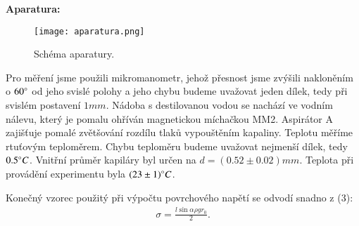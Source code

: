 \documentclass[a4paper]{article}
\begin{document}
\newline \textbf{Aparatura:} 
\newline
\begin{figure}
\centering
\texttt{[image: aparatura.png]}
\caption{Schéma aparatury. }
\end{figure}
\par Pro měření jsme použili mikromanometr, jehož přesnost jsme zvýšili nakloněním o $60 \degree $ od jeho svislé polohy a jeho chybu budeme uvažovat jeden dílek, tedy při svislém postavení $1 mm$. Nádoba s destilovanou vodou se nachází ve vodním nálevu, který je pomalu ohříván magnetickou míchačkou MM2. Aspirátor A zajišťuje pomalé zvětšování rozdílu tlaků vypouštěním kapaliny. Teplotu měříme rtuťovým teploměrem. Chybu teploměru budeme uvažovat nejmenší dílek, tedy $0.5 \degree C$. Vnitřní průměr kapiláry byl určen na $d = (0.52 \pm 0.02)mm$. Teplota při provádění experimentu byla $(23 \pm 1) \degree C$.
\newline
\par Konečný vzorec použitý při výpočtu povrchového napětí se odvodí snadno z (3):
\begin{align}
    \sigma = \frac{l\sin{\alpha} \rho g r_0}{2}.
\end{align}
\newpage
\end{document}
